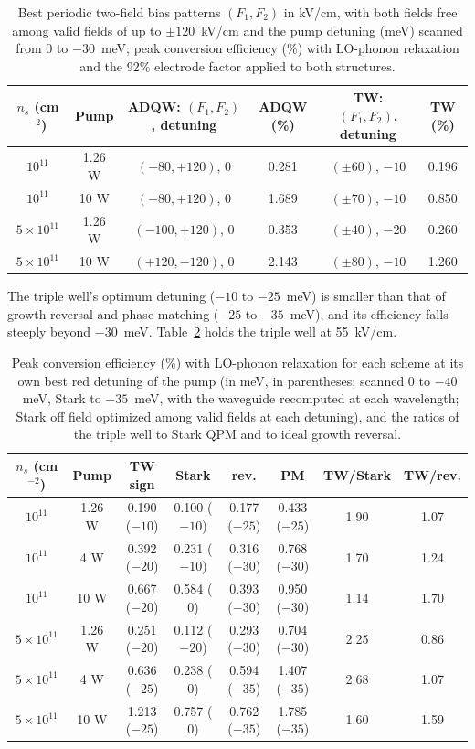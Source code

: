 \documentclass[11pt]{article}
\begin{document}
\begin{table}[t]
\centering\small
\caption{Best periodic two-field bias patterns $(F_1,F_2)$ in kV/cm, with both fields free among valid fields of up to $\pm120$~kV/cm and the pump detuning (meV) scanned from 0 to $-30$~meV; peak conversion efficiency (\%) with LO-phonon relaxation and the 92\% electrode factor applied to both structures.}\label{tab:opt}
\setlength{\tabcolsep}{4pt}
\begin{tabular}{@{}cccccc@{}}
\toprule
$n_s$ (cm$^{-2}$) & Pump & ADQW: $(F_1,F_2)$, detuning & ADQW (\%) & TW: $(F_1,F_2)$, detuning & TW (\%) \\ \midrule
$10^{11}$ & 1.26 W & $(-80,+120)$, 0 & 0.281 & $(\pm60)$, $-10$ & 0.196 \\
$10^{11}$ & 10 W & $(-80,+120)$, 0 & 1.689 & $(\pm70)$, $-10$ & 0.850 \\
$5\times10^{11}$ & 1.26 W & $(-100,+120)$, 0 & 0.353 & $(\pm40)$, $-20$ & 0.260 \\
$5\times10^{11}$ & 10 W & $(+120,-120)$, 0 & 2.143 & $(\pm80)$, $-10$ & 1.260 \\ \bottomrule
\end{tabular}
\end{table}
The triple well's optimum detuning ($-10$ to $-25$~meV) is smaller than that of growth reversal and phase matching ($-25$ to $-35$~meV), and its efficiency falls steeply beyond $-30$~meV. Table~\ref{tab:detuned} holds the triple well at 55~kV/cm.

\begin{table}[t]
\centering\small
\caption{Peak conversion efficiency (\%) with LO-phonon relaxation for each scheme at its own best red detuning of the pump (in meV, in parentheses; scanned 0 to $-40$~meV, Stark to $-35$~meV, with the waveguide recomputed at each wavelength; Stark off field optimized among valid fields at each detuning), and the ratios of the triple well to Stark QPM and to ideal growth reversal.}\label{tab:detuned}
\setlength{\tabcolsep}{3.2pt}
\begin{tabular}{@{}cccccccc@{}}
\toprule
$n_s$ (cm$^{-2}$) & Pump & TW sign & Stark & rev. & PM & TW/Stark & TW/rev. \\ \midrule
$10^{11}$ & 1.26 W & 0.190 ($-10$) & 0.100 ($-10$) & 0.177 ($-25$) & 0.433 ($-25$) & 1.90 & 1.07 \\
$10^{11}$ & 4 W & 0.392 ($-20$) & 0.231 ($-10$) & 0.316 ($-30$) & 0.768 ($-30$) & 1.70 & 1.24 \\
$10^{11}$ & 10 W & 0.667 ($-20$) & 0.584 ($0$) & 0.393 ($-30$) & 0.950 ($-30$) & 1.14 & 1.70 \\
$5\times10^{11}$ & 1.26 W & 0.251 ($-20$) & 0.112 ($-20$) & 0.293 ($-30$) & 0.704 ($-30$) & 2.25 & 0.86 \\
$5\times10^{11}$ & 4 W & 0.636 ($-25$) & 0.238 ($0$) & 0.594 ($-35$) & 1.407 ($-35$) & 2.68 & 1.07 \\
$5\times10^{11}$ & 10 W & 1.213 ($-25$) & 0.757 ($0$) & 0.762 ($-35$) & 1.785 ($-35$) & 1.60 & 1.59 \\ \bottomrule
\end{tabular}
\end{table}
\end{document}
